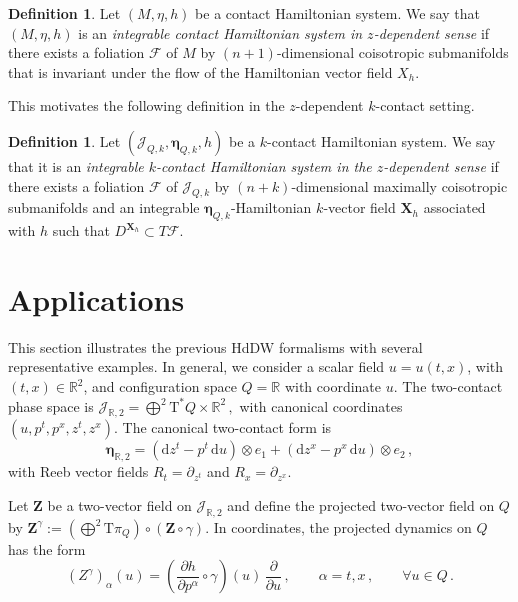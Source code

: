 \documentclass[11pt,twoside]{article}
\theoremstyle{plain}
\theoremstyle{definition}
\newtheorem{definition}[theorem]{Definition}
\theoremstyle{remark}
\newcommand{\dd}{\mathrm{d}}
\newcommand{\T}{\mathrm{T}}
\begin{document}
\begin{definition}
    Let \((M,\eta,h)\) be a contact Hamiltonian system. We say that \((M,\eta,h)\) is an \emph{integrable contact Hamiltonian system in $z$-dependent sense} if there exists a foliation \(\mathcal F\) of \(M\) by \((n+1)\)-dimensional coisotropic submanifolds that is invariant under the flow of the Hamiltonian vector field \(X_h\). 
\end{definition}

This motivates the following definition in the 
\(z\)-dependent 
\(k\)-contact setting.
\begin{definition}
Let \((\mathcal J_{Q,k},\bm\eta_{Q,k},h)\) be a \(k\)-contact Hamiltonian
system. We say that it is an \emph{integrable 
\(
k\)-contact Hamiltonian system in the 
\(z\)-dependent sense} if there exists a foliation \(\mathcal F\) of \(\mathcal J_{Q,k}\) by
\((n+k)\)-dimensional maximally coisotropic submanifolds and an integrable
\(\bm\eta_{Q,k}\)-Hamiltonian \(k\)-vector field \(\mathbf X_h\) associated
with \(h\) such that \(D^{\mathbf X_h}\subset T\mathcal F\).
\end{definition}

\section{Applications} \label{sec:Applications}

 

This section illustrates the previous HdDW formalisms with several representative examples. In general, we consider a scalar field \(u=u(t,x)\), with \((t,x)\in\mathbb{R}^2\), and configuration space \(Q=\mathbb{R}\) with coordinate \(u\). The two-contact phase space is
\(
\mathcal{J}_{\mathbb{R},2}=\bigoplus\nolimits^2 \T^*Q\times\mathbb{R}^2\,,
\)
with canonical coordinates \((u,p^t,p^x,z^t,z^x)\). The canonical two-contact form is
\[
{\bm \eta}_{\mathbb{R},2}
=
(\dd z^t-p^t\,\dd u)\otimes e_1+(\dd z^x-p^x\,\dd u)\otimes e_2\,,
\]
with Reeb vector fields \(R_t=\partial_{z^t}\) and \(R_x=\partial_{z^x}\).

Let \({\bm Z}\) be a two-vector field on \(\mathcal{J}_{\mathbb{R},2}\) and define the projected two-vector field on \(Q\) by
\(
{\bm Z}^\gamma := (\bigoplus^2 \T\pi_Q)\circ ({\bm Z}\circ\gamma).
\)
In coordinates, the projected dynamics on \(Q\) has the form
\[
(Z^\gamma)_\alpha(u)=\left(\frac{\partial h}{\partial p^\alpha}\circ\gamma\right)(u)\,\frac{\partial}{\partial u}\,,
\qquad \alpha=t,x\,,\qquad \forall u\in Q\,.
\]
\end{document}
